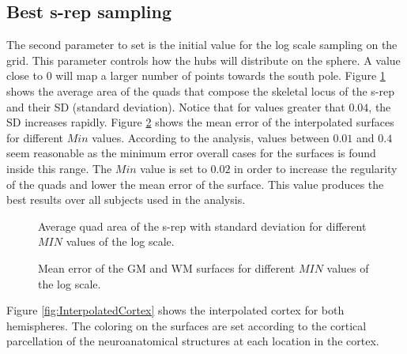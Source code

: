 \documentclass[a4paper,twoside]{article}
\begin{document}
\subsection{Best s-rep sampling}
\label{sec:minvalue}

The second parameter to set is the initial value for the log scale sampling on the grid.
This parameter controls how the hubs will distribute on the sphere. A value close to $0$ will 
map a larger number of points towards the south pole. 
Figure \ref{fig:AverageCell} shows the average area of the quads that compose the skeletal locus of the s-rep and their SD (standard deviation).
Notice that for values greater that $0.04$, the SD increases rapidly.
Figure \ref{fig:InitialLogValue} shows the mean error of the interpolated surfaces for different $Min$ values.
According to the analysis, values between $0.01$ and $0.4$ seem reasonable as 
the minimum error overall cases for the surfaces is found inside this range.
The $Min$ value is set to $0.02$
in order to increase the regularity of the quads and 
lower the mean error of the surface.
This value produces the best results over all subjects used in the analysis. 

\begin{figure} 
 \centering  
 \caption[Average area of an srep's quad.]{Average quad area of the s-rep with standard deviation for different $MIN$ values of the log scale.}
 \label{fig:AverageCell}  
\end{figure}

\begin{figure} 
 \centering 
 \caption[GM and WM surface mean error: log scale.]{Mean error of the GM and WM surfaces for different $MIN$ values of the log scale.}
 \label{fig:InitialLogValue} 
\end{figure}


Figure \ref{fig:InterpolatedCortex} shows the interpolated cortex for both hemispheres. 
The coloring on the surfaces are set according to the cortical
parcellation of the neuroanatomical structures at each location in the cortex. 
\end{document}
